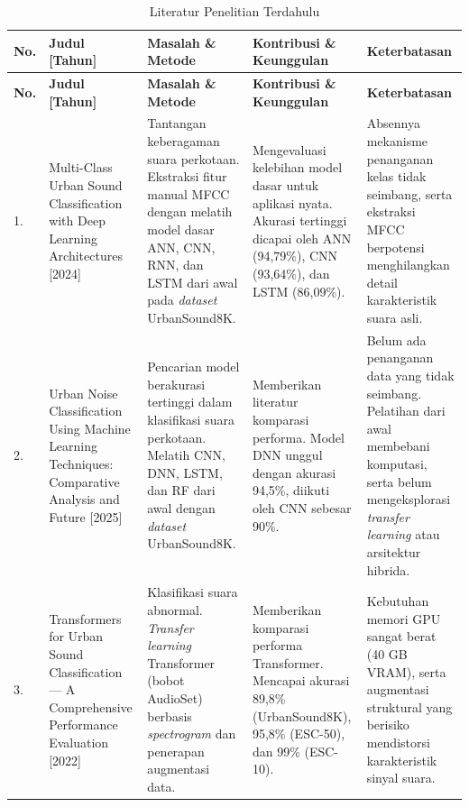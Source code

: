 \begin{longtable}{| >{\raggedright\arraybackslash}b{} | >{\raggedright\arraybackslash}p{} | >{\raggedright\arraybackslash}p{} | >{\raggedright\arraybackslash}p{} | >{\raggedright\arraybackslash}p{} |} 
    \caption{Literatur Penelitian Terdahulu}
    \label{table:2.literasi}\\
    \hline
    \textbf{No.} & \textbf{Judul [Tahun]} & \textbf{Masalah \& Metode} & \textbf{Kontribusi \& Keunggulan} & \textbf{Keterbatasan} \\
    \hline
    \endfirsthead %
    \hline
    \textbf{No.} & \textbf{Judul [Tahun]} & \textbf{Masalah \& Metode} & \textbf{Kontribusi \& Keunggulan} & \textbf{Keterbatasan} \\
    \hline
    \endhead %
    
    1. & 
    Multi-Class Urban Sound Classification with Deep Learning Architectures [2024] & 
    Tantangan keberagaman suara perkotaan. Ekstraksi fitur manual MFCC dengan melatih model dasar ANN, CNN, RNN, dan LSTM dari awal pada \textit{dataset} UrbanSound8K. & 
    Mengevaluasi kelebihan model dasar untuk aplikasi nyata. Akurasi tertinggi dicapai oleh ANN (94,79\%), CNN (93,64\%), dan LSTM (86,09\%). & 
    Absennya mekanisme penanganan kelas tidak seimbang, serta ekstraksi MFCC berpotensi menghilangkan detail karakteristik suara asli.\\ 
    \hline
    
    2. & 
    Urban Noise Classification Using Machine Learning Techniques: Comparative Analysis and Future [2025] & 
    Pencarian model berakurasi tertinggi dalam klasifikasi suara perkotaan. Melatih CNN, DNN, LSTM, dan RF dari awal dengan \textit{dataset} UrbanSound8K. & 
    Memberikan literatur komparasi performa. Model DNN unggul dengan akurasi 94,5\%, diikuti oleh CNN sebesar 90\%. & 
    Belum ada penanganan data yang tidak seimbang. Pelatihan dari awal membebani komputasi, serta belum mengeksplorasi \textit{transfer learning} atau arsitektur hibrida.\\ 
    \hline
    
    3. & 
    Transformers for Urban Sound Classification --- A Comprehensive Performance Evaluation [2022] & 
    Klasifikasi suara abnormal. \textit{Transfer learning} Transformer (bobot AudioSet) berbasis \textit{spectrogram} dan penerapan augmentasi data. & 
    Memberikan komparasi performa Transformer. Mencapai akurasi 89,8\% (UrbanSound8K), 95,8\% (ESC-50), dan 99\% (ESC-10). & 
    Kebutuhan memori GPU sangat berat (40 GB VRAM), serta augmentasi struktural yang berisiko mendistorsi karakteristik sinyal suara.\\ 
    \hline
    

\end{longtable}
